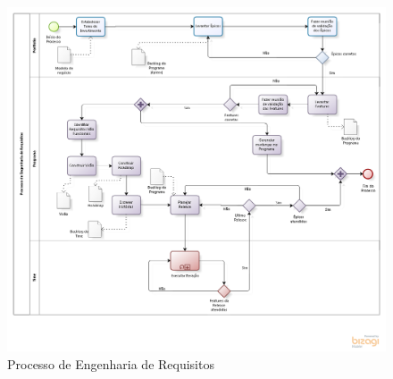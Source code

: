 \pagebreak
\begin{figure}[!htb]
\flushleft
\includegraphics[scale=0.6]{figuras/processo.png}
\caption{Processo de Engenharia de Requisitos}
\label{fig:Processo}
\end{figure}



